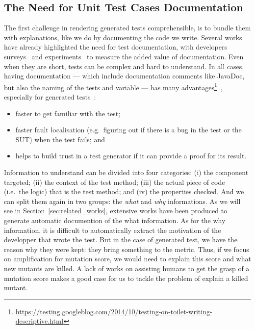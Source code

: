 \documentclass[a4paper,11pt]{sdm_internship}
\theoremstyle{definition}
\begin{document}
\subsection{The Need for Unit Test Cases Documentation}%
\label{ssec:need_doc}
The first challenge in rendering generated tests comprehensible, is to bundle them with explanations, like we do by documenting the code we write.
Several works have already highlighted the need for test documentation, with developers surveys~\cite{daka2014survey,prado2015wap,prado2016advances,prado2018towards,li2016automatically} and experiments~\cite{panichella2016impact} to measure the added value of documentation.
Even when they are short, tests can be complex and hard to understand.
In all cases, having documentation --- which include documentation comments like JavaDoc, but also the naming of the tests and variable --- has many advantages\footnote{\url{https://testing.googleblog.com/2014/10/testing-on-toilet-writing-descriptive.html}}~\cite{daka2017generating}, especially for generated tests~\cite{rojas2017search,shamshiri2018how}:
\begin{itemize}
  \item faster to get familiar with the test;
  \item faster fault localisation (e.g.\ figuring out if there is a bug in the test or the SUT) when the test fails; and
  \item helps to build trust in a test generator if it can provide a proof for its result.
\end{itemize}

Information to understand can be divided into four categories: (i) the component targeted; (ii) the context of the test method; (iii) the actual piece of code (i.e.\ the logic) that is the test method; and (iv) the properties checked.
And we can split them again in two groups: the \emph{what} and \emph{why} informations.
As we will see in Section~\ref{sec:related_works}, extensive works have been produced to generate automatic documention of the what information.
As for the why information, it is difficult to automatically extract the motivation of the developper that wrote the test.
But in the case of generated test, we have the reason why they were kept: they bring something to the metric.
Thus, if we focus on amplification for mutation score, we would need to explain this score and what new mutants are killed.
A lack of works on assisting humans to get the grasp of a mutation score makes a good case for us to tackle the problem of explain a killed mutant.
\end{document}
